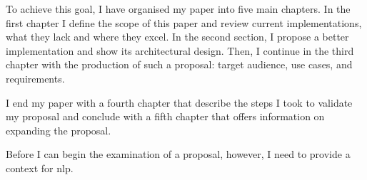 To achieve this goal, I have organised my paper into five main chapters.
In the first chapter I define the scope of this paper and review current
implementations, what they lack and where they excel.
In the second section, I propose a better implementation and show its
architectural design. Then, I continue in the third chapter with the
production of such a proposal: target audience, use cases, and
requirements.

I end my paper with a fourth chapter that describe the steps I took to validate
my proposal and conclude with a fifth chapter that offers information on
expanding the proposal.

Before I can begin the examination of a proposal, however, I need to
provide a context for \gls{nlp}.

\endgroup


